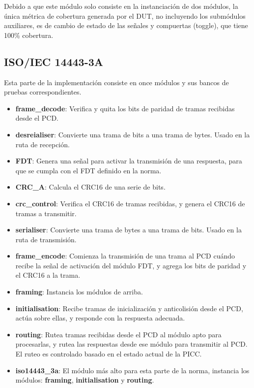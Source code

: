 \documentclass[a4paper, twoside, 11pt]{report}
\begin{document}
Debido a que este módulo solo consiste en la instanciación de dos módulos, la única métrica de cobertura generada por el DUT, no incluyendo los submódulos auxiliares, es de cambio de estado de las señales y compuertas (toggle), que tiene 100\% cobertura.

\FloatBarrier
\subsection{ISO/IEC 14443-3A}

Esta parte de la implementación consiste en once módulos y sus bancos de pruebas correspondientes. 

\begin{itemize}
  \item \textbf{frame\_decode}: Verifica y quita los bits de paridad de tramas recibidas desde el PCD.
  \item \textbf{desreialiser}: Convierte una trama de bits a una trama de bytes. Usado en la ruta de recepción.
  \item \textbf{FDT}: Genera una señal para activar la transmisión de una respuesta, para que se cumpla con el FDT definido en la norma.
  \item \textbf{CRC\_A}: Calcula el CRC16 de una serie de bits.
  \item \textbf{crc\_control}: Verifica el CRC16 de tramas recibidas, y genera el CRC16 de tramas a transmitir.
  \item \textbf{serialiser}: Convierte una trama de bytes a una trama de bits. Usado en la ruta de transmisión.
  \item \textbf{frame\_encode}: Comienza la transmisión de una trama al PCD cuándo recibe la señal de activación del módulo FDT, y agrega los bits de paridad y el CRC16 a la trama.
  \item \textbf{framing}: Instancia los módulos de arriba.
  \item \textbf{initialisation}: Recibe tramas de inicialización y anticolisión desde el PCD, actúa sobre ellas, y responde con la respuesta adecuada.
  \item \textbf{routing}: Rutea tramas recibidas desde el PCD al módulo apto para procesarlas, y rutea las respuestas desde ese módulo para transmitir al PCD. El ruteo es controlado basado en el estado actual de la PICC.
  \item \textbf{iso14443\_3a}: El módulo más alto para esta parte de la norma, instancia los módulos: \textbf{framing}, \textbf{initialisation} y \textbf{routing}.
\end{itemize}
\end{document}
